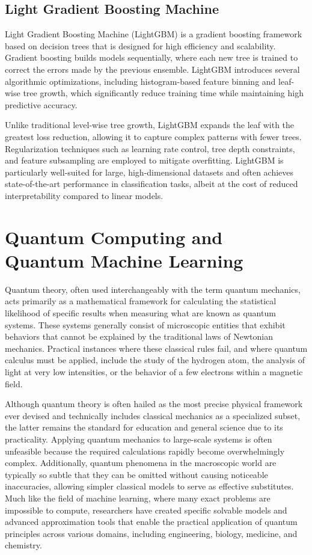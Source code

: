 \documentclass[en]{dimscthesis}
\begin{document}
\subsection{Light Gradient Boosting Machine} \label{lightgbm}

Light Gradient Boosting Machine (LightGBM) \cite{bib:lightgbm} is a gradient boosting framework based on decision trees that is designed for high efficiency and scalability. Gradient boosting builds models sequentially, where each new tree is trained to correct the errors made by the previous ensemble. LightGBM introduces several algorithmic optimizations, including histogram-based feature binning and leaf-wise tree growth, which significantly reduce training time while maintaining high predictive accuracy.

Unlike traditional level-wise tree growth, LightGBM expands the leaf with the greatest loss reduction, allowing it to capture complex patterns with fewer trees. Regularization techniques such as learning rate control, tree depth constraints, and feature subsampling are employed to mitigate overfitting. LightGBM is particularly well-suited for large, high-dimensional datasets and often achieves state-of-the-art performance in classification tasks, albeit at the cost of reduced interpretability compared to linear models.


\section{Quantum Computing and Quantum Machine Learning} \label{quantum}

Quantum theory, often used interchangeably with the term quantum mechanics, acts primarily as a mathematical framework for calculating the statistical likelihood of specific results when measuring what are known as quantum systems. These systems generally consist of microscopic entities that exhibit behaviors that cannot be explained by the traditional laws of Newtonian mechanics. Practical instances where these classical rules fail, and where quantum calculus must be applied, include the study of the hydrogen atom, the analysis of light at very low intensities, or the behavior of a few electrons within a magnetic field.

Although quantum theory is often hailed as the most precise physical framework ever devised and technically includes classical mechanics as a specialized subset, the latter remains the standard for education and general science due to its practicality. Applying quantum mechanics to large-scale systems is often unfeasible because the required calculations rapidly become overwhelmingly complex. Additionally, quantum phenomena in the macroscopic world are typically so subtle that they can be omitted without causing noticeable inaccuracies, allowing simpler classical models to serve as effective substitutes. Much like the field of machine learning, where many exact problems are impossible to compute, researchers have created specific solvable models and advanced approximation tools that enable the practical application of quantum principles across various domains, including engineering, biology, medicine, and chemistry.
\end{document}
